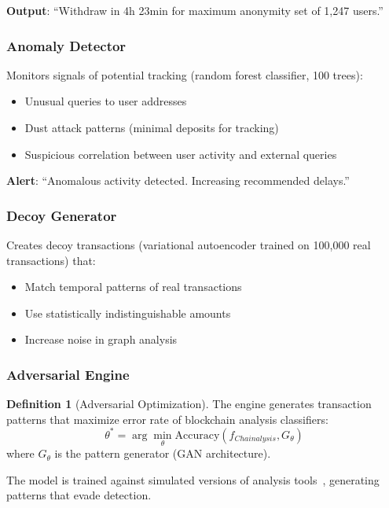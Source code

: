 \documentclass[11pt]{article}
\theoremstyle{definition}
\newtheorem{definition}{Definition}[section]
\theoremstyle{plain}
\theoremstyle{remark}
\begin{document}
\textbf{Output}: ``Withdraw in 4h 23min for maximum anonymity set of 1,247 users.''

\subsubsection{Anomaly Detector}

Monitors signals of potential tracking (random forest classifier, 100 trees):
\begin{itemize}
    \item Unusual queries to user addresses
    \item Dust attack patterns (minimal deposits for tracking)
    \item Suspicious correlation between user activity and external queries
\end{itemize}

\textbf{Alert}: ``Anomalous activity detected. Increasing recommended delays.''

\subsubsection{Decoy Generator}

Creates decoy transactions (variational autoencoder trained on 100,000 real transactions) that:
\begin{itemize}
    \item Match temporal patterns of real transactions
    \item Use statistically indistinguishable amounts
    \item Increase noise in graph analysis
\end{itemize}

\subsubsection{Adversarial Engine}

\begin{definition}[Adversarial Optimization]
The engine generates transaction patterns that maximize error rate of blockchain analysis classifiers:
\begin{equation}
\theta^* = \arg\min_{\theta} \text{Accuracy}(f_{Chainalysis}, G_\theta)
\end{equation}
where $G_\theta$ is the pattern generator (GAN architecture).
\end{definition}

The model is trained against simulated versions of analysis tools~\cite{chainalysis2023}, generating patterns that evade detection.
\end{document}
